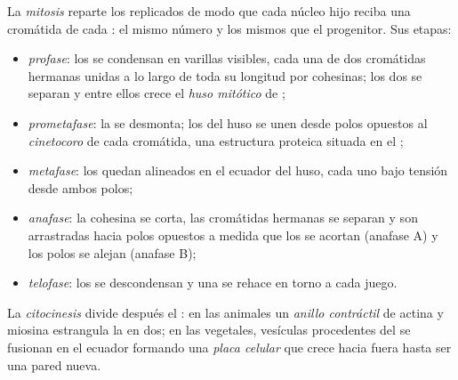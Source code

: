 \begin{definition}[Mitosis]\label{def:b1:replication-mitosis:mitosis}
La \emph{mitosis} reparte los  replicados de modo que cada núcleo
hijo reciba una cromátida de cada : el mismo número y los mismos
 que el progenitor. Sus etapas:
\begin{itemize}
  \item \emph{profase}: los  se condensan en varillas visibles,
        cada una de dos cromátidas hermanas unidas a lo largo de toda su
        longitud por  cohesinas; los dos \emph{} se
        separan y entre ellos crece el \emph{huso mitótico} de
        ;
  \item \emph{prometafase}: la  se desmonta; los
         del huso se unen desde polos opuestos al
        \emph{cinetocoro} de cada cromátida, una estructura proteica
        situada en el ;
  \item \emph{metafase}: los  quedan alineados en el ecuador del
        huso, cada uno bajo tensión desde ambos polos;
  \item \emph{anafase}: la cohesina se corta, las cromátidas hermanas se
        separan y son arrastradas hacia polos opuestos a medida que los
         se acortan (anafase A) y los polos se alejan
        (anafase B);
  \item \emph{telofase}: los  se descondensan y una  se rehace en torno a cada juego.
\end{itemize}
La \emph{citocinesis} divide después el : en las  animales
un \emph{anillo contráctil} de actina y miosina estrangula la  en dos;
en las vegetales, vesículas procedentes del  se fusionan en el ecuador
formando una \emph{placa celular} que crece hacia fuera hasta ser una pared
nueva.
\end{definition}

